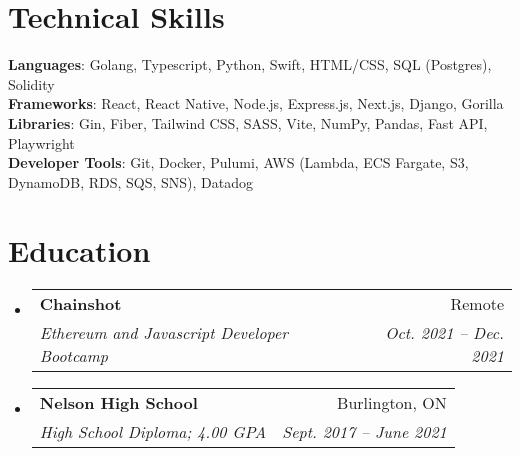 \documentclass[letterpaper,11pt]{article}
\makeatletter
\newcommand{\resumeSubheading}[4]{
  \vspace{-2pt}\item
    \begin{tabular*}{0.97\textwidth}[t]{l@{\extracolsep{\fill}}r}
      \textbf{#1} & #2 \\
      \textit{\small#3} & \textit{\small #4} \\
    \end{tabular*}\vspace{-7pt}
}
\newcommand{\resumeSubHeadingListStart}{\begin{itemize}[leftmargin=0.15in, label={}]}
\newcommand{\resumeSubHeadingListEnd}{\end{itemize}}
\makeatother
\begin{document}
\section{Technical Skills}
 \begin{itemize}[leftmargin=0.15in, label={}]
    \small{\item{
     \textbf{Languages}{: Golang, Typescript, Python, Swift, HTML/CSS, SQL (Postgres), Solidity} \\
     \textbf{Frameworks}{: React, React Native, Node.js, Express.js, Next.js, Django, Gorilla} \\
     \textbf{Libraries}{: Gin, Fiber, Tailwind CSS, SASS, Vite, NumPy, Pandas, Fast API, Playwright} \\
     \textbf{Developer Tools}{: Git, Docker, Pulumi, AWS (Lambda, ECS Fargate, S3, DynamoDB, RDS, SQS, SNS), Datadog} \\
    }}
 \end{itemize}


\section{Education}
\resumeSubHeadingListStart
  \resumeSubheading
    {Chainshot}{Remote}
    {Ethereum and Javascript Developer Bootcamp}{Oct. 2021 -- Dec. 2021}
  \resumeSubheading
    {Nelson High School}{Burlington, ON}
    {High School Diploma; 4.00 GPA}{Sept. 2017 -- June 2021}
\resumeSubHeadingListEnd

\end{document}
